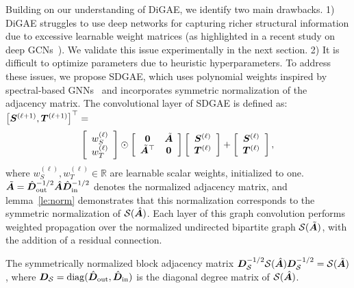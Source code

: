 Building on our understanding of DiGAE, we identify two main drawbacks. 1) DiGAE struggles to use deep networks for capturing richer structural information due to excessive learnable weight matrices (as highlighted in a recent study on deep GCNs~\cite{pengover}). We validate this issue experimentally in the next section. 2) It is difficult to optimize parameters due to heuristic hyperparameters. To address these issues, we propose SDGAE, which uses polynomial weights inspired by spectral-based GNNs~\cite{gprgnn,bernnet} and incorporates symmetric normalization of the adjacency matrix. The convolutional layer of SDGAE is defined as: $\left[{\bm{S}}^{(\ell+1)},{\bm{T}}^{(\ell+1)}\right]^{\top} =$
\begin{equation}\label{eq:bg_A_hat}
    \left[ 
        \begin{array}{c}
            w^{(\ell)}_S \\
            w^{(\ell)}_T
        \end{array}
    \right] 
    \odot
    \left[ 
        \begin{array}{cc}
            \mathbf{0} & \Tilde{{\bm{A}}} \\
            \Tilde{{\bm{A}}}^{\top} & \mathbf{0}
        \end{array}
    \right]
    \left[ 
        \begin{array}{c}
            {\bm{S}}^{(\ell)} \\
            {\bm{T}}^{(\ell)}
        \end{array}
    \right] 
    +
    \left[ 
        \begin{array}{c}
            {\bm{S}}^{(\ell)} \\
            {\bm{T}}^{(\ell)}
        \end{array}
    \right],
\end{equation}
where $w^{(\ell)}_S,w^{(\ell)}_T \in \mathbb{R}$ are learnable scalar weights, initialized to one. 
$\Tilde{{\bm{A}}}=\hat{{\bm{D}}}_{\rm out}^{-1/2}\hat{{\bm{A}}}\hat{{\bm{D}}}_{\rm in}^{-1/2}$ denotes the normalized adjacency matrix, and lemma~\ref{le:norm} demonstrates that this normalization corresponds to the symmetric normalization of $\mathcal{S}(\hat{{\bm{A}}})$. Each layer of this graph convolution performs weighted propagation over the normalized undirected bipartite graph $\mathcal{S}(\Tilde{{\bm{A}}})$, with the addition of a residual connection.
\begin{lemma}\label{le:norm}
    The symmetrically normalized block adjacency matrix $ {\bm{D}}_{\mathcal{S}}^{-1/2} \mathcal{S}(\hat{{\bm{A}}}) {\bm{D}}_{\mathcal{S}}^{-1/2} = \mathcal{S}(\Tilde{{\bm{A}}})$, where ${\bm{D}}_{\mathcal{S}} = \mathrm{diag}(\hat{{\bm{D}}}_{\rm out}, \hat{{\bm{D}}}_{\rm in})$ is the diagonal degree matrix of \(\mathcal{S}(\hat{{\bm{A}}})\).
\end{lemma}
